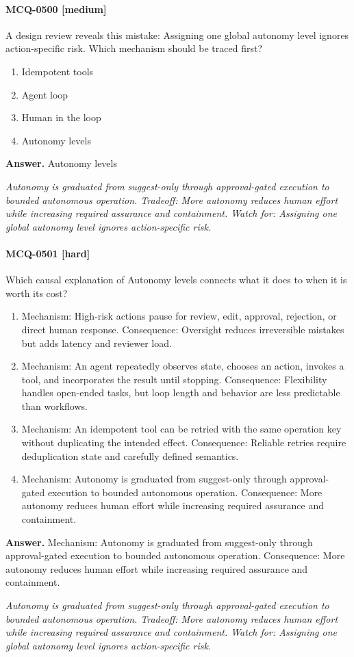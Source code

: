 \paragraph{MCQ-0500 [medium]} A design review reveals this mistake: Assigning one global autonomy level ignores action-specific risk. Which mechanism should be traced first?
\begin{enumerate}[label=\Alph*.]
\item Idempotent tools
\item Agent loop
\item Human in the loop
\item Autonomy levels
\end{enumerate}
\noindent\textbf{Answer.} Autonomy levels
\par\textit{Autonomy is graduated from suggest-only through approval-gated execution to bounded autonomous operation. Tradeoff: More autonomy reduces human effort while increasing required assurance and containment. Watch for: Assigning one global autonomy level ignores action-specific risk.}
\paragraph{MCQ-0501 [hard]} Which causal explanation of Autonomy levels connects what it does to when it is worth its cost?
\begin{enumerate}[label=\Alph*.]
\item Mechanism: High-risk actions pause for review, edit, approval, rejection, or direct human response. Consequence: Oversight reduces irreversible mistakes but adds latency and reviewer load.
\item Mechanism: An agent repeatedly observes state, chooses an action, invokes a tool, and incorporates the result until stopping. Consequence: Flexibility handles open-ended tasks, but loop length and behavior are less predictable than workflows.
\item Mechanism: An idempotent tool can be retried with the same operation key without duplicating the intended effect. Consequence: Reliable retries require deduplication state and carefully defined semantics.
\item Mechanism: Autonomy is graduated from suggest-only through approval-gated execution to bounded autonomous operation. Consequence: More autonomy reduces human effort while increasing required assurance and containment.
\end{enumerate}
\noindent\textbf{Answer.} Mechanism: Autonomy is graduated from suggest-only through approval-gated execution to bounded autonomous operation. Consequence: More autonomy reduces human effort while increasing required assurance and containment.
\par\textit{Autonomy is graduated from suggest-only through approval-gated execution to bounded autonomous operation. Tradeoff: More autonomy reduces human effort while increasing required assurance and containment. Watch for: Assigning one global autonomy level ignores action-specific risk.}
